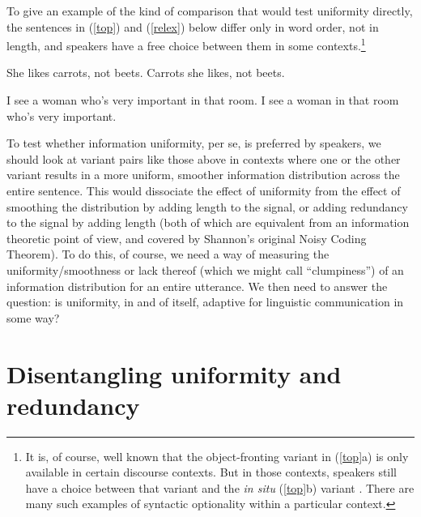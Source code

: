 \documentclass[12pt]{article}
\begin{document}
To give an example of the kind of comparison that would test uniformity directly, the sentences in (\ref{top}) and (\ref{relex}) below differ only in word order, not in length, and speakers have a free choice between them in some contexts.\footnote{It is, of course, well known that the object-fronting variant in (\ref{top}a) is only available in certain discourse contexts. But in those contexts, speakers still have a choice between that variant and the \textsl{in situ} (\ref{top}b) variant \citep{prince1998, prince1999}. There are many such examples of syntactic optionality within a particular context.} 

\begin{exe}
	\ex \label{top} \begin{xlist} \ex She likes carrots, not beets.
		\ex Carrots she likes, not beets.
		\end{xlist}
	\ex \label{relex} \begin{xlist}
		\ex I see a woman who's very important in that room.
		\ex I see a woman in that room who's very important.
	\end{xlist}
\end{exe}

\noindent To test whether information uniformity, per se, is preferred by speakers, we should look at variant pairs like those above in contexts where one or the other variant results in a more uniform, smoother information distribution across the entire sentence. This would dissociate the effect of uniformity from the effect of smoothing the distribution by adding length to the signal, or adding redundancy to the signal by adding length (both of which are equivalent from an information theoretic point of view, and covered by Shannon's original Noisy Coding Theorem). To do this, of course, we need a way of measuring the uniformity/smoothness or lack thereof (which we might call ``clumpiness'') of an information distribution for an entire utterance. We then need to answer the question: is uniformity, in and of itself, adaptive for linguistic communication in some way?



\section{Disentangling uniformity and redundancy}
\label{disentangle}
\end{document}

